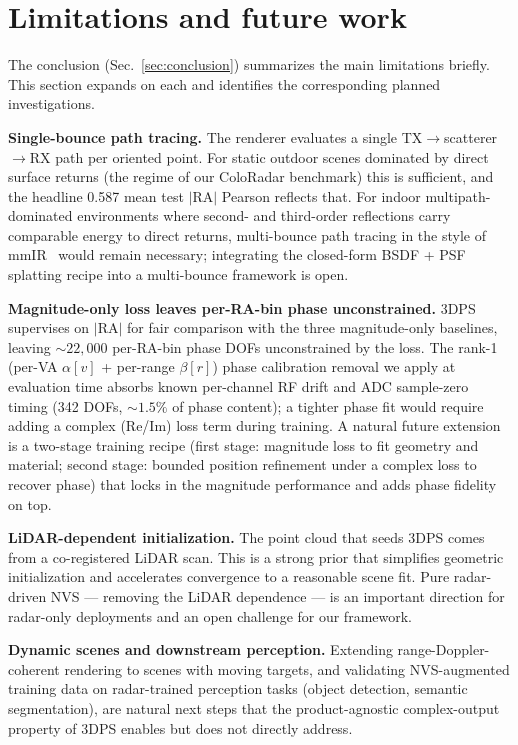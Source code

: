 \section{Limitations and future work}
\label{app:limitations}

The conclusion (Sec.~\ref{sec:conclusion}) summarizes the main limitations briefly. This section expands on each and identifies the corresponding planned investigations.

\textbf{Single-bounce path tracing.} The renderer evaluates a single TX$\to$scatterer$\to$RX path per oriented point. For static outdoor scenes dominated by direct surface returns (the regime of our ColoRadar benchmark) this is sufficient, and the headline 0.587 mean test $|\mathrm{RA}|$ Pearson reflects that. For indoor multipath-dominated environments where second- and third-order reflections carry comparable energy to direct returns, multi-bounce path tracing in the style of mmIR~\cite{mmIR2026} would remain necessary; integrating the closed-form BSDF + PSF splatting recipe into a multi-bounce framework is open.

\textbf{Magnitude-only loss leaves per-RA-bin phase unconstrained.} 3DPS supervises on $|\mathrm{RA}|$ for fair comparison with the three magnitude-only baselines, leaving $\sim\!22{,}000$ per-RA-bin phase DOFs unconstrained by the loss. The rank-1 (per-VA $\alpha[v]$ + per-range $\beta[r]$) phase calibration removal we apply at evaluation time absorbs known per-channel RF drift and ADC sample-zero timing (342 DOFs, ${\sim}1.5\%$ of phase content); a tighter phase fit would require adding a complex (Re/Im) loss term during training. A natural future extension is a two-stage training recipe (first stage: magnitude loss to fit geometry and material; second stage: bounded position refinement under a complex loss to recover phase) that locks in the magnitude performance and adds phase fidelity on top.

\textbf{LiDAR-dependent initialization.} The point cloud that seeds 3DPS comes from a co-registered LiDAR scan. This is a strong prior that simplifies geometric initialization and accelerates convergence to a reasonable scene fit. Pure radar-driven NVS --- removing the LiDAR dependence --- is an important direction for radar-only deployments and an open challenge for our framework.

\textbf{Dynamic scenes and downstream perception.} Extending range-Doppler-coherent rendering to scenes with moving targets, and validating NVS-augmented training data on radar-trained perception tasks (object detection, semantic segmentation), are natural next steps that the product-agnostic complex-output property of 3DPS enables but does not directly address.

